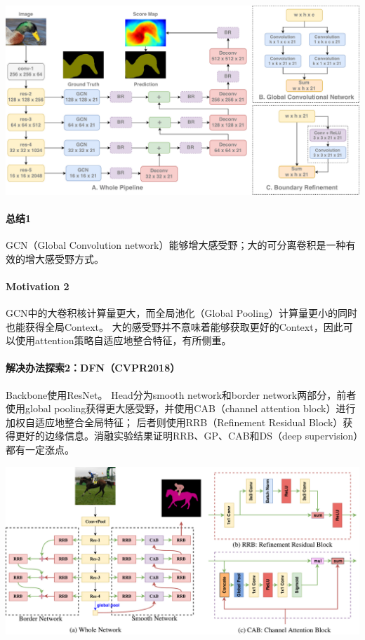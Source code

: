 \documentclass[UTF8, a4paper]{ctexart}
\begin{document}
{\includegraphics[width=0.95\linewidth]{GCN-network}}

\paragraph{总结1}
GCN（Global Convolution network）能够增大感受野；大的可分离卷积是一种有效的增大感受野方式。

\paragraph{Motivation 2}
GCN中的大卷积核计算量更大，而全局池化（Global Pooling）计算量更小的同时也能获得全局Context。
大的感受野并不意味着能够获取更好的Context，因此可以使用attention策略自适应地整合特征，有所侧重。

\paragraph{解决办法探索2：DFN（CVPR2018）\cite{DFN}}
Backbone使用ResNet。
Head分为smooth network和border network两部分，前者使用global pooling获得更大感受野，并使用CAB（channel attention block）进行加权自适应地整合全局特征；
后者则使用RRB（Refinement Residual Block）获得更好的边缘信息。消融实验结果证明RRB、GP、CAB和DS（deep supervision）都有一定涨点。

{\includegraphics[width=0.95\linewidth]{DFN-network}}
\end{document}
